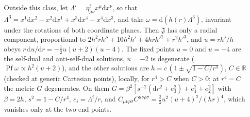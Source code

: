 Outside this class, let \(\Lambda^i=\eta^i_{\mu\nu}x^\mu\mathrm dx^\nu\), so that \(\Lambda^3=x^1\mathrm dx^2-x^2\mathrm dx^1+x^3\mathrm dx^4-x^4\mathrm dx^3\), and take \(\omega=\mathrm d(h(r)\Lambda^3)\), invariant under the rotations of both coordinate planes. Then \(\mathfrak J\) has only a radial component, proportional to \(2h^2rh''+10h^2h'+4hrh'^2+r^2h'^3\), and \(u=rh'/h\) obeys \(r\,\mathrm du/\mathrm dr=-\tfrac12u(u+2)(u+4)\). The fixed points \(u=0\) and \(u=-4\) are the self-dual and anti-self-dual solutions, \(u=-2\) is degenerate (\(\operatorname{Pf}\omega\propto h^2(u+2)\)), and the other solutions are \(h=c\,(1\pm\sqrt{1-C/r^4})\), \(C\in\mathbb R\) (checked at generic Cartesian points), locally, for \(r^4>C\) when \(C>0\); at \(r^4=C\) the metric \(G\) degenerates. On them \(G=\beta^2[s^{-2}(\mathrm dr^2+e_3^2)+e_1^2+e_2^2]\) with \(\beta=2h\), \(s^2=1-C/r^4\), \(e_i=\Lambda^i/r\), and \(C_{\mu\nu\rho\sigma}C^{\mu\nu\rho\sigma}=\tfrac32u^2(u+4)^2/(hr)^4\), which vanishes only at the two end points.

